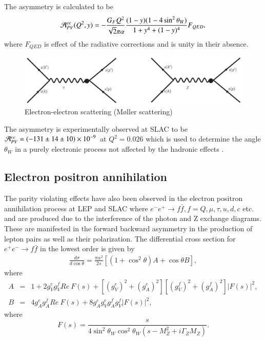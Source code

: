 The asymmetry is calculated to be
\begin{equation}
{\cal A}_{PV}^{ee}(Q^2,y)= -\frac{G_F Q^2}{\sqrt{2}\pi\alpha} \frac{(1-y)(1-4\sin^2\theta_W)}{1+y^4+(1-y)^4} F_{QED}, \label{chap9-eq36}
\end{equation}
where  $F_{QED}$ is effect of the radiative corrections and is unity in their absence. 
\medskip

\begin{figure}[H]
\centering
\includegraphics[scale=0.35]{src/images/chap9/fig4.jpg}
\caption{Electron-electron scattering (M\o ller scattering)}\label{chap9-fig5}
\end{figure}

The asymmetry is experimentally observed at SLAC to be ${\cal A}_{PV}^{ee}= (-131\pm14\pm10)\times{10}^{-9}$ at $Q^2=0.026$
which is used to determine the angle $\theta_W$ in a purely electronic process not affected by the hadronic effects \cite{chap9-key29}. 

\subsection{Electron positron annihilation}\label{chap9-subsec3.5}

The parity violating effects have also been observed in the electron positron annihilation process at  LEP and SLAC where $e^-e^+\rightarrow f\bar{f}, f=Q,\mu,\tau,u,d,c$ etc. and  are produced due to the interference of the photon and Z exchange diagrams. These are manifested in the forward backward asymmetry in the production of lepton pairs as well as their polarization. The differential cross section for $e^+e^-\rightarrow f\bar{f}$ in the lowest order is given by \cite{chap9-key30}
\begin{eqnarray}
 \frac{d \sigma}{d \cos\theta}=\frac{\pi \alpha^{2}}{2s}\left[ (1+ \cos^2 \theta )A + \cos\theta  B\right],  \label{chap9-eq37}
\end{eqnarray}
where
\begin{eqnarray}
 A&=& 1+2g_{V}^{e}g_{V}^{f}Re~F(s)+[(g_{V}^{e})^2+(g_{A}^{e})^2][(g_{V}^{f})^2+(g_{A}^{f})^2]|F(s)|^2 ,\nonumber \\
 B&=&4g_{A}^{e}g_{A}^{f} Re~F(s)+ 8g_{A}^{e}g_{V}^{e}g_{A}^{f}g_{V}^{f}|F(s)|^2, \label{chap9-eq38}
 \end{eqnarray}
where
\begin{equation}
F(s)=\frac{s}{4\sin^2\theta_{W}\cos^2\theta_{W}(s-M_{Z}^2+i\Gamma_{Z}M_{Z})}. \label{chap9-eq39}
\end{equation}


